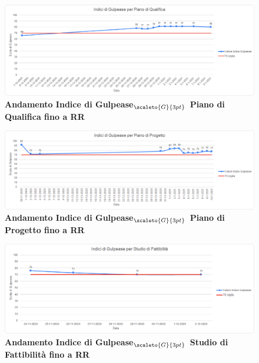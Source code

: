 {\begin{figure}[!h]
	\begin{center}
		\includegraphics[width=1\linewidth]{../immagini/IndexGulpeasePdQ.png}
		\caption{\textbf{Andamento Indice di Gulpease$_{\scaleto{G}{3pt}}$ Piano di Qualifica fino a RR}}
	\end{center}
\end{figure}

\begin{figure}[!h]
	\begin{center}
		\includegraphics[width=1\linewidth]{../immagini/IndexGulpeasePdP.png}
		\caption{\textbf{Andamento Indice di Gulpease$_{\scaleto{G}{3pt}}$ Piano di Progetto fino a RR}}
	\end{center}
\end{figure}

\begin{figure}[H]
	\begin{center}
		\includegraphics[width=1\linewidth]{../immagini/IndexGulpeaseSdF.png}
		\caption{\textbf{Andamento Indice di Gulpease$_{\scaleto{G}{3pt}}$ Studio di Fattibilità fino a RR}}
	\end{center}
\end{figure}

}
